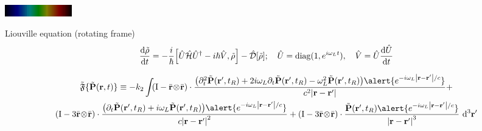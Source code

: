 \documentclass[aspectratio=169]{beamer}
\newcommand{\oper}[1]{\mathcal{#1}}
\newcommand{\outerprod}[2]{#1 \! \otimes \! #2}
\begin{document}
\begin{frame}
  \includegraphics[width=\textwidth, height=0.5cm]{figures/Helium_spectrum_visible}
      \begin{block}{Liouville equation (rotating frame)}
        \begin{gather*}
          \dv{\tilde{\rho}}{t} = -\frac{i}{\hbar} \commutator{\hat{U}\hat{\oper{H}}\hat{U}^\dagger - i\hbar \hat{V}}{\tilde{\rho}} - \hat{\oper{D}}\qty[\tilde{\rho}]; \quad \hat{U} = \mathrm{diag}(1, e^{i \omega_L t}), \quad \hat{V} = \hat{U} \dv{\hat{U}}{t}
        \end{gather*}
      \end{block}

      \begin{gather*}
        \tilde{\mathfrak{F}}\{\tilde{\vb{P}}(\vb{r}, t) \} \equiv -k_2 \int_{}
        \qty(\mathrm{I} -  \outerprod{\bar{\vb{r}}}{\bar{\vb{r}}} ) \cdot \frac{\qty(\partial_t^2 \tilde{\vb{P}}(\vb{r}', t_R) + 2 i \omega_L \partial_t \tilde{\vb{P}}(\vb{r}', t_R) - \omega_L^2 \tilde{\vb{P}}(\vb{r}', t_R)) \alert{e^{-i \omega_L \abs{\vb{r} - \vb{r}'}/c}}}{c^2 \abs{\vb{r}-\vb{r}'}} + \\
        \qty(\mathrm{I} - 3\outerprod{\bar{\vb{r}}}{\bar{\vb{r}}} ) \cdot \frac{\qty(\partial_t \tilde{\vb{P}}(\vb{r}', t_R) + i \omega_L \tilde{\vb{P}}(\vb{r}', t_R))\alert{e^{-i \omega_L \abs{\vb{r} - \vb{r}'}/c}}}{c \abs{\vb{r}-\vb{r}'}^2} +
        \qty(\mathrm{I} - 3\outerprod{\bar{\vb{r}}}{\bar{\vb{r}}} ) \cdot \frac{                \tilde{\vb{P}}(\vb{r}', t_R) \alert{e^{-i \omega_L \abs{\vb{r} - \vb{r}'}/c}}}{\abs{\vb{r}-\vb{r}'}^3}
        \, \dd[3]{\vb{r'}}
      \end{gather*}
\end{frame}
\end{document}
